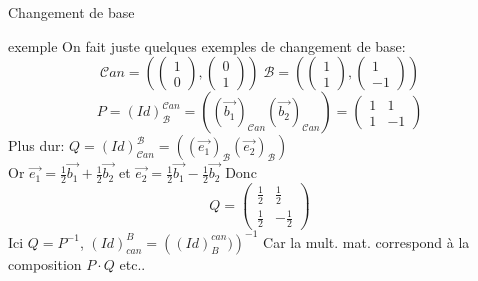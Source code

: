 \begin{parag}{Changement de base}
        \begin{subparag}{exemple}
                On fait juste quelques exemples de changement de base:
                \[\mathcal{C}an = \left(\begin{pmatrix}
                    1 \\ 0
                \end{pmatrix}, \begin{pmatrix}
                    0 \\ 1
                \end{pmatrix} \right) \; \mathcal{B} = \left( \begin{pmatrix}
                    1 \\ 1
                \end{pmatrix}, \begin{pmatrix}
                    1 \\ -1
                \end{pmatrix} \right)\]
        \[P = \left(Id\right)_{\mathcal{B}}^{\mathcal{C}an} = \left(\left(\vec{b_1}\right)_{\mathcal{C}an} \left(\vec{b_2}\right)_{\mathcal{C}an}\right) = \begin{pmatrix}
            1 & 1 \\ 1 & -1
        \end{pmatrix}\]
        Plus dur: $Q = \left(Id\right)_{\mathcal{C}an}^\mathcal{B} =  \left(\left(\vec{e_1}\right)_{\mathcal{B}} \left(\vec{e_2}\right)_{\mathcal{B}}\right)$ 
        \\
        Or $\vec{e_1} = \frac{1}{2}\vec{b_1} + \frac{1}{2}\vec{b_2}$ et $\vec{e_2} = \frac{1}{2}\vec{b_1} - \frac{1}{2}\vec{b_2}$
        Donc 
        \[Q = \begin{pmatrix}
            \frac{1}{2} & \frac{1}{2} \\ \frac{1}{2} & -\frac{1}{2}
        \end{pmatrix}\]
        Ici $Q = P^{-1}$, $(Id)_{can}^{B} = \left( (Id)_B^{can})\right)^{-1}$
        Car la mult. mat. correspond à la composition $P \cdot Q$ etc..
        \end{subparag}
        
\end{parag}
